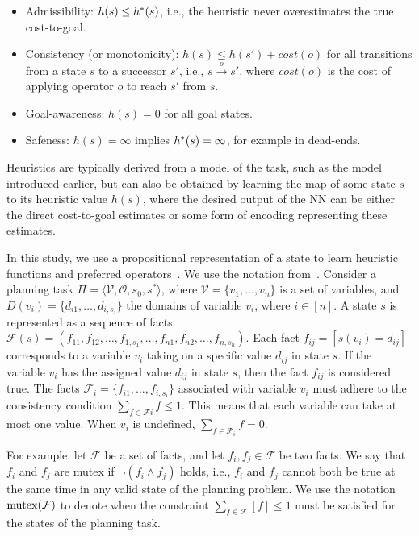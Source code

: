 \documentclass[ppgc,diss,english]{iiufrgs}
\begin{document}
\begin{itemize}
\item Admissibility: $h(s) \le h^{*}{(s)}$, i.e., the heuristic never overestimates the true cost-to-goal.
\item Consistency (or monotonicity): $h(s) \le h(s') + cost(o)$ for all transitions from a state $s$ to a successor $s'$, i.e., $s \xrightarrow{o} s'$, where $cost(o)$ is the cost of applying operator $o$ to reach $s'$ from $s$.
\item Goal-awareness: $h(s) = 0$ for all goal states.
\item Safeness: $h(s) = \infty$ implies $h^{*} (s) = \infty$, for example in dead-ends.
\end{itemize}

Heuristics are typically derived from a model of the task, such as the \sas model introduced earlier, but can also be obtained by learning the map of some state $s$ to its heuristic value $h(s)$, where the desired output of the NN can be either the direct cost-to-goal estimates or some form of encoding representing these estimates.

In this study, we use a propositional representation of a state to learn heuristic functions and preferred operators~\cite{Ferber.etal/2020a,Yu.etal/2020,Ferber.etal/2022,OToole/2022,Bettker.etal/2022}. We use the notation from~\citet{Bettker.etal/2022}.
Consider a planning task $\Pi=\langle\mathcal{V},\mathcal{O},s_0,s^*\rangle$, where $\mathcal{V}=\{v_1,\ldots,v_n\}$ is a set of variables, and $D(v_i)=\{d_{i1},\ldots,d_{i,s_i}\}$ the domains of variable $v_i$, where $i\in[n]$.
A state $s$ is represented as a sequence of facts $\mathcal{F}(s)=(f_{11},f_{12},\ldots,f_{1,s_1},\ldots,f_{n1},f_{n2},\ldots,f_{n,s_n})$. Each fact $f_{ij}=[s(v_i)=d_{ij}]$ corresponds to a variable $v_i$ taking on a specific value $d_{ij}$ in state $s$. If the variable $v_i$ has the assigned value $d_{ij}$ in state $s$, then the fact $f_{ij}$ is considered true.
The facts $\mathcal{F}_{i}=\{f_{i1},\ldots,f_{i,s_i}\}$ associated with variable $v_i$ must adhere to the consistency condition $\sum_{f\in \mathcal{F}i} f\leq 1$. This means that each variable can take at most one value. When $v_i$ is undefined, $\sum_{f\in \mathcal{F}_i} f=0$.

For example, let $\mathcal{F}$ be a set of facts, and let $f_i, f_j \in \mathcal{F}$ be two facts. We say that $f_i$ and $f_j$ are mutex if $\neg(f_i \land f_j)$ holds, i.e., $f_i$ and $f_j$ cannot both be true at the same time in any valid state of the planning problem.
We use the notation $\operatorname{mutex}(\mathcal{F})$ to denote when the constraint $\sum_{f\in \mathcal{F}} [f]\leq 1$ must be satisfied for the states of the planning task.
\end{document}

